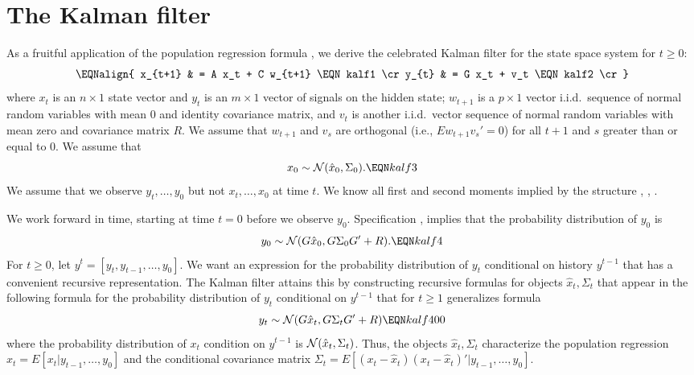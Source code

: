 \section{The Kalman filter}\label{sec:Kalman100}%
%
%
%
As a fruitful  application of the population regression formula
, we derive the celebrated Kalman filter for the
state space system for $t \geq 0$:
$$\EQNalign{ x_{t+1} & = A x_t + C w_{t+1} \EQN kalf1 \cr
             y_{t} & = G x_t + v_t \EQN kalf2 \cr} $$
where $x_t$ is an $n \times 1$ state vector and $y_t$ is an $m
\times 1$ vector of signals on the hidden state; $w_{t+1}$
is a $p \times 1$ vector i.i.d.~sequence of normal random variables
with mean $0$ and identity covariance matrix, and $v_t$ is another i.i.d.~vector sequence of normal random variables with mean zero and
covariance matrix $R$.  We assume that $w_{t+1}$ and $v_s$
are orthogonal (i.e., $E w_{t+1} v_s'=0$) for all $t+1$ and $s$ greater than or equal to $0$.
We assume that
$$x_0 \sim {\cal N}(\hat x_0, \Sigma_0) . \EQN kalf3 $$
We assume that we  observe $y_t, \ldots, y_0$ but not $x_t, \ldots , x_0$ at time
$t$. We know all  first and second moments implied by   the structure , , .

We work forward in time, starting at time $t=0$ before we observe $y_0$.
Specification ,  implies that the probability distribution of $y_0$ is
$$ y_0 \sim {\cal N}(G \hat x_0, G \Sigma_0 G' + R). \EQN kalf4 $$
For $t \geq 0$, let $y^t = [y_t, y_{t-1}, \ldots, y_0]$.  We want  an expression for the probability  distribution of $y_t$ conditional on
history
$y^{t-1}$ that has a convenient recursive representation. The Kalman filter attains this by constructing recursive formulas for objects $\hat x_t, \Sigma_t$
 that appear in the following formula for the probability distribution of $y_t$ conditional on $y^{t-1}$  that for $t \geq 1$ generalizes
 formula  
$$ y_t \sim {\cal N}(G \hat x_t, G \Sigma_t G' + R) \EQN kalf400 $$
where the probability distribution of $x_t$ condition on $y^{t-1}$ is ${\cal N}(\hat x_t, \Sigma_t)$. Thus, 
the objects $\hat x_t, \Sigma_t$  characterize  the population regression $\hat x_t = E [ x_t | y_{t-1}, \ldots, y_0]$ and
the conditional covariance matrix
$\Sigma_t = E [(x_t -\hat x_t)(x_t -\hat x_t)' | y_{t-1}, \ldots, y_0]$.


